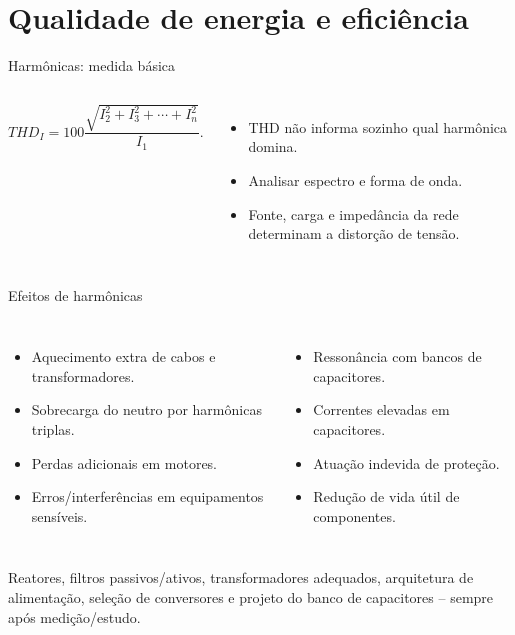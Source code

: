 \section{Qualidade de energia e eficiência}

\begin{frame}{Harmônicas: medida básica}
\small
\begin{columns}[T,onlytextwidth]
\[
THD_I=100\frac{\sqrt{I_2^2+I_3^2+\cdots+I_n^2}}{I_1}.
\]
\begin{itemize}
\item THD não informa sozinho qual harmônica domina.
\item Analisar espectro e forma de onda.
\item Fonte, carga e impedância da rede determinam a distorção de tensão.
\end{itemize}
\end{columns}
\end{frame}

\begin{frame}{Efeitos de harmônicas}
\small
\begin{columns}[T,onlytextwidth]
\begin{itemize}
\item Aquecimento extra de cabos e transformadores.
\item Sobrecarga do neutro por harmônicas triplas.
\item Perdas adicionais em motores.
\item Erros/interferências em equipamentos sensíveis.
\end{itemize}
\begin{itemize}
\item Ressonância com bancos de capacitores.
\item Correntes elevadas em capacitores.
\item Atuação indevida de proteção.
\item Redução de vida útil de componentes.
\end{itemize}
\end{columns}
\begin{caixaProjeto}[title=Mitigação]
Reatores, filtros passivos/ativos, transformadores adequados, arquitetura de alimentação, seleção de conversores e projeto do banco de capacitores -- sempre após medição/estudo.
\end{caixaProjeto}
\end{frame}

